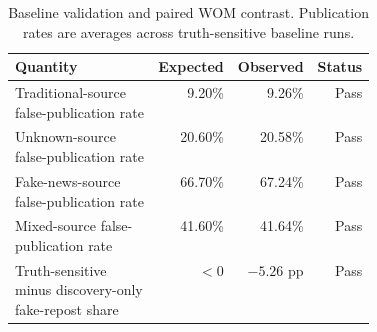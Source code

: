 \begin{table}[tbp]
\centering
\caption{Baseline validation and paired WOM contrast. Publication rates are averages across truth-sensitive baseline runs.}
\label{tab:baseline}
\begin{tabular}{p{0.42\linewidth}rrr}
\toprule
Quantity & Expected & Observed & Status \\
\midrule
Traditional-source false-publication rate & 9.20\% & 9.26\% & Pass \\
Unknown-source false-publication rate & 20.60\% & 20.58\% & Pass \\
Fake-news-source false-publication rate & 66.70\% & 67.24\% & Pass \\
Mixed-source false-publication rate & 41.60\% & 41.64\% & Pass \\
Truth-sensitive minus discovery-only fake-repost share & $<0$ & $-5.26$ pp & Pass \\
\bottomrule
\end{tabular}
\end{table}
